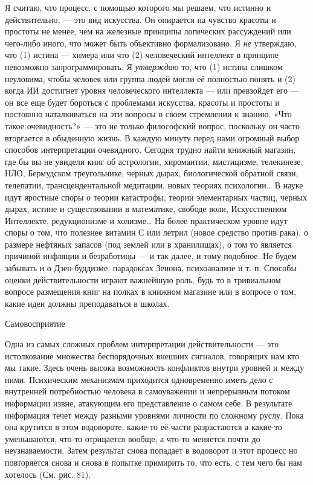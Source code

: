 \documentclass[../main.tex]{subfiles}
\begin{document}
Я считаю, что процесс, с помощью которого мы решаем, что истинно и действительно, --- это вид искусства. Он опирается на чувство красоты и простоты не менее, чем на железные принципы логических рассуждений или чего-либо иного, что может быть объективно формализовано. Я \emph{не} утверждаю, что (1) истина --- химера или что (2) человеческий интеллект в принципе невозможно запрограммировать. Я \emph{утверждаю} то, что (1) истина слишком неуловима, чтобы человек или группа людей могли её полностью понять и (2) когда ИИ достигнет уровня человеческого интеллекта --- или превзойдет его --- он все еще будет бороться с проблемами искусства, красоты и простоты и постоянно наталкиваться на эти вопросы в своем стремлении к знанию. «Что такое очевидность?» --- это не только философский вопрос, поскольку он часто вторгается в обыденную жизнь. В каждую минуту перед нами огромный выбор способов интерпретации очевидного. Сегодня трудно найти книжный магазин, где бы вы не увидели книг об астрологии, хиромантии, мистицизме, телекинезе, НЛО, Бермудском треугольнике, черных дырах, биологической обратной связи, телепатии, трансцендентальной медитации, новых теориях психологии\ldots{} В науке идут яростные споры о теории катастрофы, теории элементарных частиц, черных дырах, истине и существовании в математике, свободе воли, Искусственном Интеллекте, редукционизме и холизме\ldots{} На более практическом уровне идут споры о том, что полезнее витамин С или летрил (новое средство против рака), о размере нефтяных запасов (под землей или в хранилищах), о том то является причиной инфляции и безработицы --- и так далее, и тому подобное. Не будем забывать и о Дзен-буддизме, парадоксах Зенона, психоанализе и т. п. Способы оценки действительности играют важнейшую роль, будь то в тривиальном вопросе размещения книг на полках в книжном магазине или в вопросе о том, какие идеи должны преподаваться в школах.

Самовосприятие

Одна из самых сложных проблем интерпретации действительности --- это истолкование множества беспорядочных внешних сигналов, говорящих нам кто мы такие. Здесь очень высока возможность конфликтов внутри уровней и между ними. Психическим механизмам приходится одновременно иметь дело с внутренней потребностью человека в самоуважении и непрерывным потоком информации извне, атакующим его представление о самом себе. В результате информация течет между разными уровнями личности по сложному руслу. Пока она крутится в этом водовороте, какие-то её части разрастаются а какие-то уменьшаются, что-то отрицается вообще, а что-то меняется почти до неузнаваемости. Затем результат снова попадает в водоворот и этот процесс но повторяется снова и снова в попытке примирить то, что есть, с тем чего бы нам хотелось (См. рис. 81).
\end{document}
